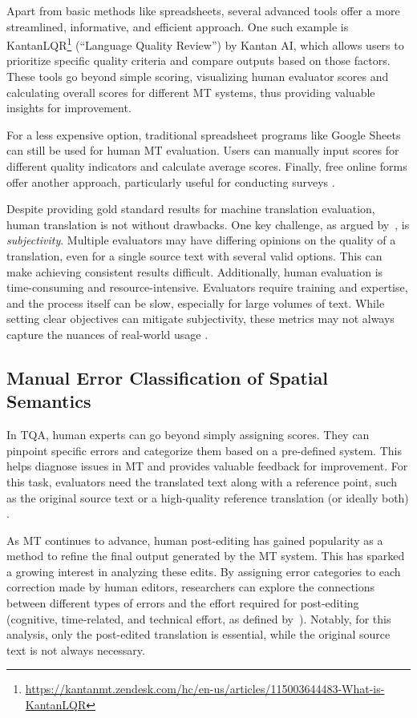 {{Apart from basic methods like spreadsheets, several advanced tools offer a more streamlined, informative, and efficient approach. One such example is KantanLQR\footnote{\href{https://kantanmt.zendesk.com/hc/en-us/articles/115003644483-What-is-KantanLQR}{https://kantanmt.zendesk.com/hc/en-us/articles/115003644483-What-is-KantanLQR}} (``Language Quality Review'') by Kantan AI, which allows users to prioritize specific quality criteria and compare outputs based on those factors. These tools go beyond simple scoring, visualizing human evaluator scores and calculating overall scores for different MT systems, thus providing valuable insights for improvement.

For a less expensive option, traditional spreadsheet programs like Google Sheets can still be used for human MT evaluation. Users can manually input scores for different quality indicators and calculate average scores. Finally, free online forms offer another approach, particularly useful for conducting surveys \parencite[58]{Rossi2022}.

Despite providing gold standard results for machine translation evaluation, human translation is not without drawbacks. One key challenge, as argued by~\textcite{Rossi2022}, is \emph{subjectivity}. Multiple evaluators may have differing opinions on the quality of a translation, even for a single source text with several valid options. This can make achieving consistent results difficult. Additionally, human evaluation is time-consuming and resource-intensive. Evaluators require training and expertise, and the process itself can be slow, especially for large volumes of text. While setting clear objectives can mitigate subjectivity, these metrics may not always capture the nuances of real-world usage \parencite{popovic-2018}.


\subsection{Manual Error Classification of Spatial Semantics}

In TQA, human experts can go beyond simply assigning scores. They can pinpoint specific errors and categorize them based on a pre-defined system. This helps diagnose issues in MT and provides valuable feedback for improvement. For this task, evaluators need the translated text along with a reference point, such as the original source text or a high-quality reference translation (or ideally both) \parencite{Rossi2022, popovic-2018}.

As MT continues to advance, human post-editing has gained popularity as a method to refine the final output generated by the MT system. This has sparked a growing interest in analyzing these edits. By assigning error categories to each correction made by human editors, researchers can explore the connections between different types of errors and the effort required for post-editing (cognitive, time-related, and technical effort, as defined by~\textcite{popovic-2018, Kittredge2002KringsHP}). Notably, for this analysis, only the post-edited translation is essential, while the original source text is not always necessary.

}}

